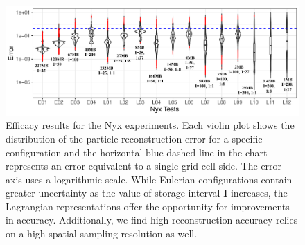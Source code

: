 \begin{figure}[!b]
\centering
\includegraphics[width=\linewidth]{Images/nyx_violinplot.pdf}
\vspace{-5mm}
\caption{Efficacy results for the Nyx experiments. Each violin plot shows the distribution of the particle reconstruction error for a specific configuration and the horizontal blue dashed line in the chart represents an error equivalent to a single grid cell side. The error axis uses a logarithmic scale. While Eulerian configurations contain greater uncertainty as the value of storage interval \textbf{I} increases, the Lagrangian representations offer the opportunity for improvements in accuracy. Additionally, we find high reconstruction accuracy relies on a high spatial sampling resolution as well.}
\label{fig:nyx_violinplot}
\end{figure}
